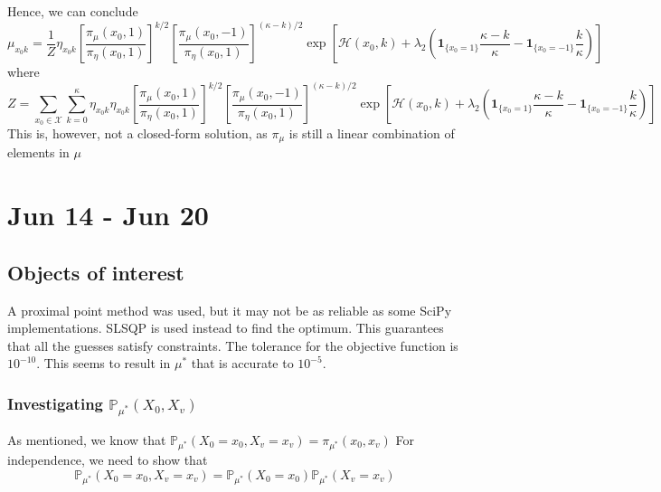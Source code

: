 \documentclass[12pt]{article}
\begin{document}
Hence, we can conclude
\begin{equation*}
    \mu_{x_0k} = \frac1Z \eta_{x_0k} \left[\frac{\pi_\mu(x_0, 1)}{\pi_\eta(x_0, 1)}\right]^{k/2} \left[\frac{\pi_\mu(x_0, -1)}{\pi_\eta(x_0, 1)}\right]^{(\kappa - k)/2} \exp\left[\mathcal{H}(x_0, k) + \lambda_2 \left(\mathbf{1}_{\{x_0=1\}}\frac{\kappa - k}{\kappa} -
        \mathbf{1}_{\{x_0=-1\}}\frac{k}{\kappa}\right)\right]
\end{equation*}
where
\begin{equation*}
    Z = \sum_{x_0\in\mathcal{X}}\sum_{k=0}^\kappa \eta_{x_0k} \eta_{x_0k} \left[\frac{\pi_\mu(x_0, 1)}{\pi_\eta(x_0, 1)}\right]^{k/2} \left[\frac{\pi_\mu(x_0, -1)}{\pi_\eta(x_0, 1)}\right]^{(\kappa - k)/2} \exp\left[\mathcal{H}(x_0, k) + \lambda_2 \left(\mathbf{1}_{\{x_0=1\}}\frac{\kappa - k}{\kappa} -
        \mathbf{1}_{\{x_0=-1\}}\frac{k}{\kappa}\right)\right]
\end{equation*}
This is, however, not a closed-form solution, as $\pi_\mu$ is still a linear combination of elements in $\mu$

\pagebreak

\section{Jun 14 - Jun 20}

\subsection{Objects of interest}

A proximal point method was used, but it may not be as reliable as some SciPy implementations. SLSQP is used instead
to find the optimum. This guarantees that all the guesses satisfy constraints. The tolerance for the objective function is $10^{-10}$.
This seems to result in $\mu^*$ that is accurate to $10^{-5}$.

\subsubsection{Investigating $\mathbb{P}_{\mu^*}(X_0, X_v)$}

As mentioned, we know that $\mathbb{P}_{\mu^*}(X_0=x_0, X_v=x_v) = \pi_{\mu^*}(x_0, x_v)$
For independence, we need to show that
\begin{equation*}
    \mathbb{P}_{\mu^*}(X_0=x_0, X_v=x_v) =  \mathbb{P}_{\mu^*}(X_0=x_0) \mathbb{P}_{\mu^*}(X_v=x_v)
\end{equation*}
\end{document}
